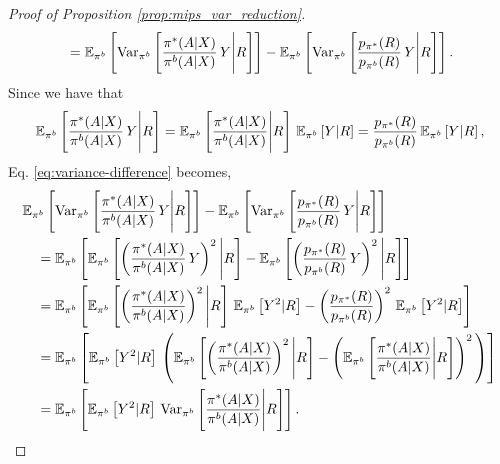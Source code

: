 \begin{proof}[Proof of Proposition \ref{prop:mips_var_reduction}]
\begin{align}
    &\quad= \mathbb{E}_{\pi^b}\left[ \textup{Var}_{\pi^b}\left[\frac{\pi^*(A|X)}{\pi^b(A|X)}\,Y\Bigg| R \right]\right] - \mathbb{E}_{\pi^b}\left[\textup{Var}_{\pi^b}\left[ \frac{p_{\pi^*}(R)}{p_{\pi^b}(R)}\,Y \Bigg| R\right]\right]. \label{eq:variance-difference}
\end{align}
Since we have that 
\begin{align*}
    \mathbb{E}_{\pi^b}\left[\frac{\pi^*(A|X)}{\pi^b(A|X)}\,Y\Bigg| R \right] = \mathbb{E}_{\pi^b}\left[\frac{\pi^*(A|X)}{\pi^b(A|X)}\Bigg| R \right]\,\mathbb{E}_{\pi^b}\left[Y| R \right] = \frac{p_{\pi^*}(R)}{p_{\pi^b}(R)}\,\mathbb{E}_{\pi^b}\left[Y| R \right],
\end{align*}
Eq. \eqref{eq:variance-difference} becomes,
\begin{align*}
    &\mathbb{E}_{\pi^b}\left[ \textup{Var}_{\pi^b}\left[\frac{\pi^*(A|X)}{\pi^b(A|X)}\,Y\Bigg| R \right]\right] - \mathbb{E}_{\pi^b}\left[\textup{Var}_{\pi^b}\left[ \frac{p_{\pi^*}(R)}{p_{\pi^b}(R)}\,Y \Bigg| R\right]\right] \\
    &\quad= \mathbb{E}_{\pi^b}\left[ \mathbb{E}_{\pi^b}\left[ \left(\frac{\pi^*(A|X)}{\pi^b(A|X)}\,Y \right)^2\Bigg| R  \right] - \mathbb{E}_{\pi^b}\left[ \left(\frac{p_{\pi^*}(R)}{p_{\pi^b}(R)}\,Y \right)^2\Bigg| R \right] \right]\\
    &\quad= \mathbb{E}_{\pi^b}\left[ \mathbb{E}_{\pi^b}\left[ \left(\frac{\pi^*(A|X)}{\pi^b(A|X)} \right)^2 \Bigg| R  \right] \, \mathbb{E}_{\pi^b}\left[Y^2 | R  \right] - \left(\frac{p_{\pi^*}(R)}{p_{\pi^b}(R)}\right)^2\,\mathbb{E}_{\pi^b}\left[Y^2 | R \right] \right]\\
    &\quad= \mathbb{E}_{\pi^b}\left[\mathbb{E}_{\pi^b}\left[Y^2 | R \right]\, \left( \mathbb{E}_{\pi^b}\left[ \left(\frac{\pi^*(A|X)}{\pi^b(A|X)} \right)^2 \Bigg| R  \right] - \left(\mathbb{E}_{\pi^b}\left[ \frac{\pi^*(A|X)}{\pi^b(A|X)} \Bigg| R  \right]\right)^2\, \right) \right]\\
    &\quad=\mathbb{E}_{\pi^b}\left[\mathbb{E}_{\pi^b}\left[Y^2 | R \right]\, \textup{Var}_{\pi^b}\left[\frac{\pi^*(A|X)}{\pi^b(A|X)} \Bigg| R \right]\right].
\end{align*}
\end{proof}

